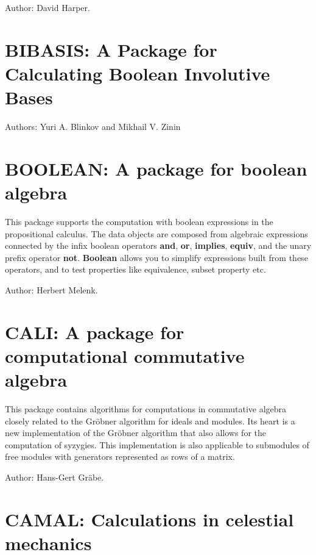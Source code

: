 Author: David Harper.


\newpage

\section{BIBASIS: A Package for Calculating Boolean Involutive Bases}
 \label{BIBASIS}

Authors: Yuri A. Blinkov and Mikhail V. Zinin


\newpage

\section{BOOLEAN: A package for boolean algebra} 

This package supports the computation with boolean expressions in the
propositional calculus.  The data objects are composed from algebraic
expressions connected by the infix boolean operators {\bf and}, {\bf or},
{\bf implies}, {\bf equiv}, and the unary prefix operator {\bf not}.
{\bf Boolean} allows you to simplify expressions built from these
operators, and to test properties like equivalence, subset property etc.

Author: Herbert Melenk.


\newpage

\section{CALI: A package for computational commutative algebra}

This package contains algorithms for computations in commutative algebra
closely related to the Gr\"obner algorithm for ideals and modules.  Its
heart is a new implementation of the Gr\"obner algorithm that also allows
for the computation of syzygies.  This implementation is also applicable to
submodules of free modules with generators represented as rows of a matrix.

Author: Hans-Gert Gr\"abe.


\newpage

\section{CAMAL: Calculations in celestial mechanics}
\label{CAMAL}

